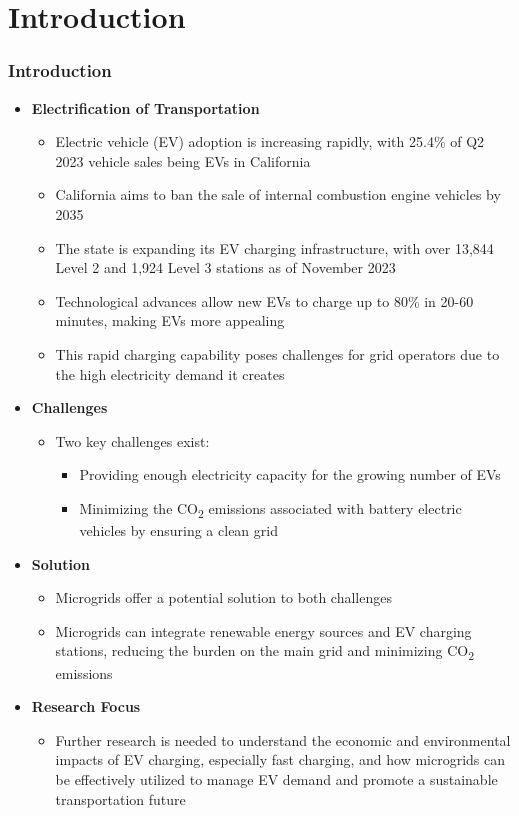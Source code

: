 \documentclass[aspectratio=169, 8 pt]{beamer}
\begin{document}
\section{Introduction}
\begin{frame}[allowframebreaks]
	\frametitle{Introduction}	
	\begin{itemize} \Large
		\item \textbf{Electrification of Transportation}
		\begin{itemize} \large
			\item Electric vehicle (EV) adoption is increasing rapidly, with 25.4\% of Q2 2023 vehicle sales being EVs in California
			\item California aims to ban the sale of internal combustion engine vehicles by 2035
			\item The state is expanding its EV charging infrastructure, with over 13,844 Level 2 and 1,924 Level 3 stations as of November 2023
			\item Technological advances allow new EVs to charge up to 80\% in 20-60 minutes, making EVs more appealing
			\item This rapid charging capability poses challenges for grid operators due to the high electricity demand it creates
		\end{itemize}
		\item \textbf{Challenges}
		\begin{itemize} \large
			\item Two key challenges exist: 
			\begin{itemize} \large
				\item Providing enough electricity capacity for the growing number of EVs
				\item Minimizing the CO\textsubscript{2} emissions associated with battery electric vehicles by ensuring a clean grid
			\end{itemize}
		\end{itemize}
		\framebreak
		\item \textbf{Solution}
		\begin{itemize} \large
			\item Microgrids offer a potential solution to both challenges
			\item Microgrids can integrate renewable energy sources and EV charging stations, reducing the burden on the main grid and minimizing CO\textsubscript{2} emissions
		\end{itemize}
		\item \textbf{Research Focus}
		\begin{itemize} \large
			\item Further research is needed to understand the economic and environmental impacts of EV charging, especially fast charging, and how microgrids can be effectively utilized to manage EV demand and promote a sustainable transportation future
		\end{itemize}
	\end{itemize}
\end{frame}
	
\end{document}
